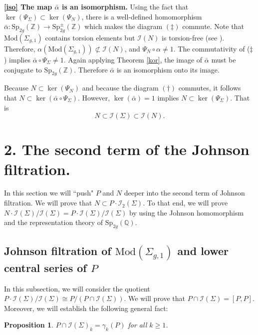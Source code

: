 \documentclass[a4paper]{amsproc}
\theoremstyle{TheoremNum}
\theoremstyle{Theorembold}
\newtheorem{prop}[thm]{Proposition}
\theoremstyle{TheoremboldDef}
\theoremstyle{TheoremboldRem}
\theoremstyle{TheoremboldRem}
\begin{document}
\textbf{\ref{iso} The map $\bar{\alpha}$ is an isomorphism.} Using the fact that $\ker(\Psi_\Sigma)\subset\ker(\Psi_N)$, there is a well-defined homomorphism $\bar{\alpha}:{\text{Sp}_{2g}({\mathbb{Z}})}\to{\text{Sp}_{2g}^{\pm}({\mathbb{Z}})}$ which makes the diagram $(\ddagger)$ commute.
Note that ${\text{Mod}(\Sigma_{g,1})}$ contains torsion elements but ${{\mathcal{I}}(N)}$ is torsion-free (see \cite[Sect.2 pp.101)]{hain}). Therefore, ${\alpha}({\text{Mod}(\Sigma_{g,1})})\not\subset{{\mathcal{I}}(N)}$, and $\Psi_N\circ{\alpha}\not=1$. The commutativity of ($\ddagger$) implies $\bar{\alpha}\circ \Psi_\Sigma\not=1$. Again applying Theorem \ref{kor}, the image of $\bar{\alpha}$ must be conjugate to ${\text{Sp}_{2g}({\mathbb{Z}})}$. Therefore $\bar{\alpha}$ is an isomorphism onto its image.

Because $N\subset \ker(\Psi_N)$ and because the diagram $(\dagger)$ commutes, it follows that $N\subset \ker(\bar{\alpha}\circ\Psi_\Sigma)$. However, $\ker(\bar{\alpha})=1$ implies $N\subset\ker(\Psi_\Sigma)$. That is \[N\subset{{\mathcal{I}}(\Sigma)}\subset{{\mathcal{I}}(N)}.\]

\section*{2. The second term of the Johnson filtration.}
\addtocounter{section}{1}
\setcounter{subsection}{0}
In this section we will ``push" $P$ and $N$ deeper into the second term of Johnson filtration. We will prove that $N\subset P\cdot {{\mathcal{I}}_2(\Sigma)}$. To that end, we will prove $N\cdot{{\mathcal{I}}(\Sigma)}/{{\mathcal{I}}(\Sigma)}=P\cdot{{\mathcal{I}}(\Sigma)}/{{\mathcal{I}}(\Sigma)}$ by using the Johnson homomorphism and the representation theory of ${\text{Sp}_{2g}({\mathbb{Q}})}$.

\subsection{Johnson filtration of ${\text{Mod}(\Sigma_{g,1})}$ and lower central series of $P$} In this subsection, we will consider the quotient $P\cdot{{\mathcal{I}}(\Sigma)}/{{\mathcal{I}}(\Sigma)}\cong P/(P\cap{{\mathcal{I}}(\Sigma)})$. We will prove that $P\cap{{\mathcal{I}}(\Sigma)}=[P,P]$. Moreover, we will establish the following general fact:
\begin{prop}\label{mainlemma}$P\cap {{\mathcal{I}}(\Sigma)}_k=\gamma_k(P)$ for all $k{\geqslant} 1$.
\end{prop}
\end{document}
